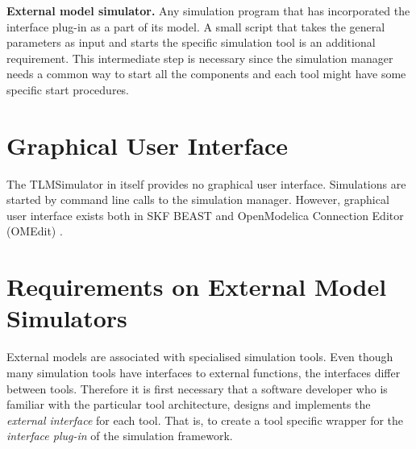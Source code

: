 \textbf{External model simulator.} 
Any simulation program that has incorporated the interface plug-in as a part of its model. 
A small script that takes the general parameters as input and starts the specific simulation tool is an additional requirement. 
This intermediate step is necessary since the simulation manager needs a common way to start all the components and each tool might have some specific start procedures.

\section{Graphical User Interface}
The TLMSimulator in itself provides no graphical user interface.
Simulations are started by command line calls to the simulation manager.
However, graphical user interface exists both in SKF BEAST and OpenModelica Connection Editor (OMEdit) \cite{alachew2015}. 


\section{Requirements on External Model Simulators}
\label{sec:requirements}
External models are associated with specialised simulation tools. 
Even though many simulation tools have interfaces to external functions, the interfaces differ between tools. 
Therefore it is first necessary that a software developer who is familiar with the particular tool architecture, designs and implements the {\em external interface} for each tool. 
That is, to create a tool specific wrapper for the {\em interface plug-in} of the simulation framework.

